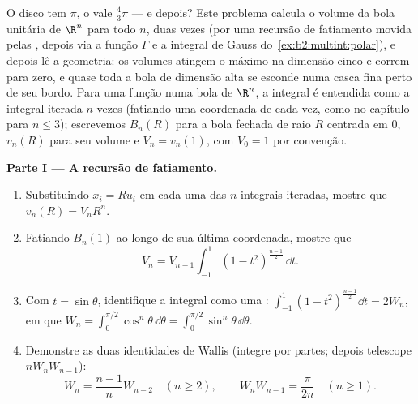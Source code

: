 \begin{problem}[{Problema de fim de semana --- $V_n =
\pi^{n/2}/\Gamma(\frac n2 + 1)$, e a estranheza das
dimensões altas}]\label{pb:b2:multint:1}
O disco tem  $\pi$, o  vale $\frac43\pi$ --- e
depois? Este problema calcula o volume da bola unitária de
$\R^n$ para todo $n$, duas vezes (por uma recursão de fatiamento movida
pelas , depois via a função $\Gamma$ e a
integral de Gauss do~\cref{ex:b2:multint:polar}), e depois lê
a geometria: os volumes atingem o máximo na dimensão cinco e correm
para zero, e quase toda a bola de dimensão alta se esconde numa
casca fina perto de seu bordo. Para uma função  numa bola de $\R^n$, a
integral é entendida como a integral iterada $n$ vezes
(fatiando uma coordenada de cada vez, como no capítulo para $n
\leq 3$); escrevemos $B_n(R)$ para a bola fechada de raio $R$
centrada em $0$, $v_n(R)$ para seu volume e $V_n =
v_n(1)$, com $V_0 = 1$ por convenção.

\medskip
\noindent\textbf{Parte I --- A recursão de fatiamento.}
\begin{enumerate}
  \item Substituindo $x_i = Ru_i$ em cada uma das $n$ integrais
        iteradas, mostre que $v_n(R) = V_nR^n$.
  \item Fatiando $B_n(1)$ ao longo de sua última coordenada, mostre que
        \[
        V_n = V_{n-1}\int_{-1}^{1}(1 -
        t^2)^{\frac{n-1}2}\,\dd t .
        \]
  \item Com $t = \sin\theta$, identifique a integral como uma
        : $\int_{-1}^1(1 -
        t^2)^{\frac{n-1}2}\dd t = 2W_n$, em que $W_n =
        \int_0^{\pi/2}\cos^n\theta\,\dd\theta =
        \int_0^{\pi/2}\sin^n\theta\,\dd\theta$.
  \item Demonstre as duas identidades de Wallis (integre por partes;
        depois telescope $nW_nW_{n-1}$):
        \[
        W_n = \frac{n-1}nW_{n-2} \quad (n \geq 2),
        \qquad
        W_nW_{n-1} = \frac{\pi}{2n} \quad (n \geq 1).
        \]
\end{enumerate}


\end{problem}
